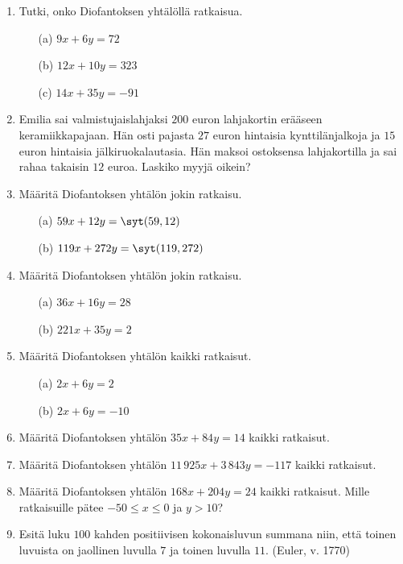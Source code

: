\begin{enumerate}

\item Tutki, onko Diofantoksen yhtälöllä ratkaisua.
\begin{itemize}
\item[(a)] $9x + 6y = 72$
\item[(b)] $12x + 10y = 323$
\item[(c)] $14x + 35y = -91$
\end{itemize}

\item Emilia sai valmistujaislahjaksi $200$ euron lahjakortin erääseen keramiikkapajaan. Hän osti pajasta $27$ euron hintaisia kynttilänjalkoja ja $15$ euron hintaisia jälkiruokalautasia. Hän maksoi ostoksensa lahjakortilla ja sai rahaa takaisin $12$ euroa. Laskiko myyjä oikein?

\item Määritä Diofantoksen yhtälön jokin ratkaisu.
\begin{itemize}
\item[(a)] $59x + 12y = \syt(59,12)$
\item[(b)] $119x + 272y = \syt(119,272)$
\end{itemize}

\item Määritä Diofantoksen yhtälön jokin ratkaisu.
\begin{itemize}
\item[(a)] $36x + 16y = 28$
\item[(b)] $221x + 35y = 2$
\end{itemize}

\item Määritä Diofantoksen yhtälön kaikki ratkaisut.
\begin{itemize}
\item[(a)] $2x + 6y = 2$
\item[(b)] $2x + 6y = -10$
\end{itemize}

\item Määritä Diofantoksen yhtälön $35x + 84y = 14$ kaikki ratkaisut.

\item Määritä Diofantoksen yhtälön $11\, 925x + 3\, 843y = -117$ kaikki ratkaisut.

\item Määritä Diofantoksen yhtälön $168x + 204y = 24$ kaikki ratkaisut. Mille ratkaisuille pätee $-50 \le x \le 0$ ja $y > 10$?

\item  Esitä luku $100$ kahden positiivisen kokonaisluvun summana niin, että toinen luvuista on jaollinen luvulla $7$ ja toinen luvulla $11$. (Euler, v. 1770)


\end{enumerate}
